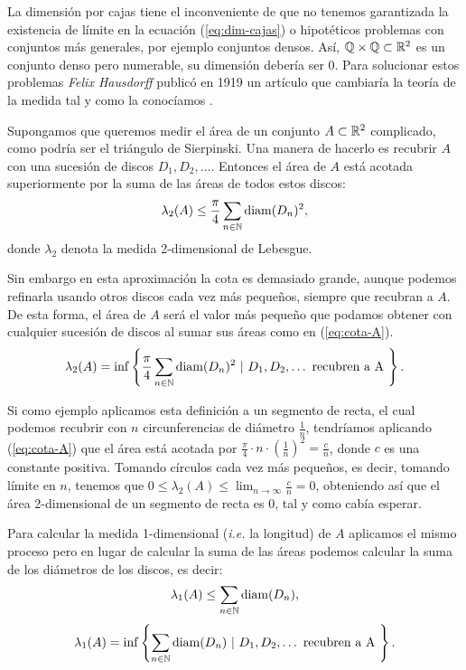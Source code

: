 La dimensión por cajas tiene el inconveniente de que no tenemos garantizada la existencia de límite en la ecuación (\ref{eq:dim-cajas}) o hipotéticos problemas con conjuntos más generales, por ejemplo conjuntos densos. Así, $\mathbb{Q}\times\mathbb{Q}\subset\mathbb{R}^2$ es un conjunto denso pero numerable, su dimensión debería ser 0. Para solucionar estos problemas \textit{Felix Hausdorff} publicó en 1919 un artículo que cambiaría la teoría de la medida tal y como la conocíamos \cite{Hausdorff1919}. 

Supongamos que queremos medir el área de un conjunto $A\subset\mathbb{R}^2$ complicado, como podría ser el triángulo de Sierpinski. Una manera de hacerlo es recubrir $A$ con una sucesión de discos $D_1,D_2,\dots$. Entonces el área de $A$ está acotada superiormente por la suma de las áreas de todos estos discos:
\begin{equation}\label{eq:cota-A}
\lambda_2(A)\leq \frac \pi 4 \sum_{n\in\mathbb{N}}\mathrm{diam}(D_n)^2,
\end{equation}
donde $\lambda_2$ denota la medida 2-dimensional de Lebesgue.

Sin embargo en esta aproximación la cota es demasiado grande, aunque podemos refinarla usando otros discos cada vez más pequeños, siempre que recubran a $A$. De esta forma, el área de $A$ será el valor más pequeño que podamos obtener con cualquier sucesión de discos al sumar sus áreas como en (\ref{eq:cota-A}).
\begin{equation}
\lambda_2(A)=\inf\left\lbrace \frac \pi 4 \sum_{n\in\mathbb{N}}\mathrm{diam}(D_n)^2 \ | \  D_1,D_2,\dots \text{ recubren a A }\right\rbrace.
\end{equation}

Si como ejemplo aplicamos esta definición a un segmento de recta, el cual podemos recubrir con $n$ circunferencias de diámetro $\frac 1 n$, tendríamos aplicando (\ref{eq:cota-A}) que el área está acotada por $\frac \pi 4 \cdot n \cdot \left(\frac 1 n\right)^2=\frac c n$, donde $c$ es una constante positiva. Tomando círculos cada vez más pequeños, es decir, tomando límite en $n$, tenemos que $0 \leq \lambda_2(A) \leq \lim_{n\rightarrow\infty}\frac c n = 0$, obteniendo así que el área 2-dimensional de un segmento de recta es 0, tal y como cabía esperar.

Para calcular la medida 1-dimensional (\textit{i.e.} la longitud) de $A$ aplicamos el mismo proceso pero en lugar de calcular la suma de las áreas podemos calcular la suma de los diámetros de los discos, es decir:
$$
\lambda_1(A)\leq\sum_{n\in\mathbb{N}}\mathrm{diam}(D_n),
$$
$$
\lambda_1(A)=\inf\left\lbrace \sum_{n\in\mathbb{N}}\mathrm{diam}(D_n) \ | \  D_1,D_2,\dots \text{ recubren a A }\right\rbrace.
$$

